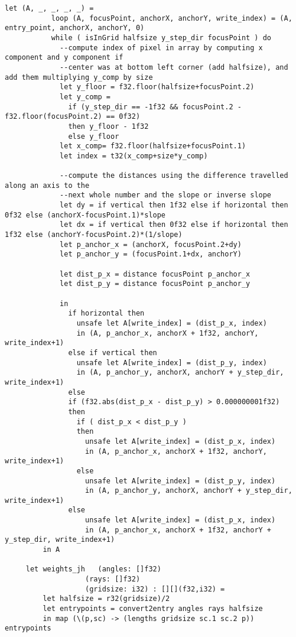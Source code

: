 \begin{lstlisting}[language=Futhark]
         let (A, _, _, _, _) =
           loop (A, focusPoint, anchorX, anchorY, write_index) = (A, entry_point, anchorX, anchorY, 0)
           while ( isInGrid halfsize y_step_dir focusPoint ) do
             --compute index of pixel in array by computing x component and y component if
             --center was at bottom left corner (add halfsize), and add them multiplying y_comp by size
             let y_floor = f32.floor(halfsize+focusPoint.2)
             let y_comp =
               if (y_step_dir == -1f32 && focusPoint.2 - f32.floor(focusPoint.2) == 0f32)
               then y_floor - 1f32
               else y_floor
             let x_comp= f32.floor(halfsize+focusPoint.1)
             let index = t32(x_comp+size*y_comp)

             --compute the distances using the difference travelled along an axis to the
             --next whole number and the slope or inverse slope
             let dy = if vertical then 1f32 else if horizontal then 0f32 else (anchorX-focusPoint.1)*slope
             let dx = if vertical then 0f32 else if horizontal then 1f32 else (anchorY-focusPoint.2)*(1/slope)
             let p_anchor_x = (anchorX, focusPoint.2+dy)
             let p_anchor_y = (focusPoint.1+dx, anchorY)

             let dist_p_x = distance focusPoint p_anchor_x
             let dist_p_y = distance focusPoint p_anchor_y

             in
               if horizontal then
                 unsafe let A[write_index] = (dist_p_x, index)
                 in (A, p_anchor_x, anchorX + 1f32, anchorY, write_index+1)
               else if vertical then
                 unsafe let A[write_index] = (dist_p_y, index)
                 in (A, p_anchor_y, anchorX, anchorY + y_step_dir, write_index+1)
               else
               if (f32.abs(dist_p_x - dist_p_y) > 0.000000001f32)
               then
                 if ( dist_p_x < dist_p_y )
                 then
                   unsafe let A[write_index] = (dist_p_x, index)
                   in (A, p_anchor_x, anchorX + 1f32, anchorY, write_index+1)
                 else
                   unsafe let A[write_index] = (dist_p_y, index)
                   in (A, p_anchor_y, anchorX, anchorY + y_step_dir, write_index+1)
               else
                   unsafe let A[write_index] = (dist_p_x, index)
                   in (A, p_anchor_x, anchorX + 1f32, anchorY + y_step_dir, write_index+1)
         in A

     let weights_jh   (angles: []f32)
                   (rays: []f32)
                   (gridsize: i32) : [][](f32,i32) =
         let halfsize = r32(gridsize)/2
         let entrypoints = convert2entry angles rays halfsize
         in map (\(p,sc) -> (lengths gridsize sc.1 sc.2 p)) entrypoints


\end{lstlisting}
